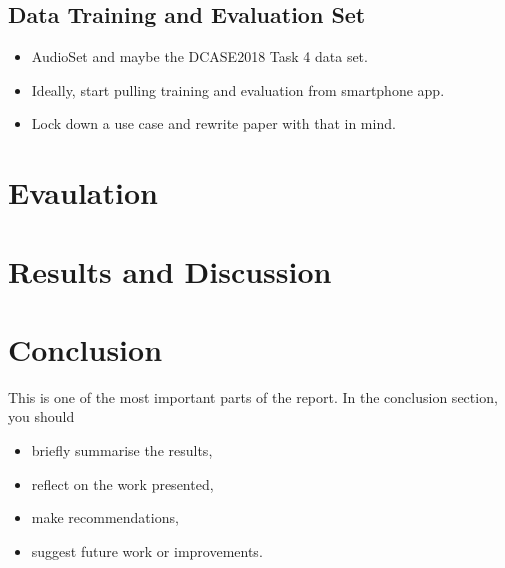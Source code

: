 \documentclass{UoNMCHA}
\numberwithin{equation}{section}
\begin{document}
\subsection{Data Training and Evaluation Set}
\begin{itemize}
    \item AudioSet and maybe the DCASE2018 Task 4 data set.
    \item Ideally, start pulling training and evaluation from smartphone app. 
    \item Lock down a use case and rewrite paper with that in mind.
\end{itemize}

\section{Evaulation}


\section{Results and Discussion}


\section{Conclusion}\label{sec:Conclusion}
This is one of the most important parts of the report. In the conclusion section, you  should 
\begin{itemize}
\item briefly summarise the results,
\item reflect on the work presented, 
\item make recommendations,
\item suggest future work or improvements.
\end{itemize}
\end{document}
